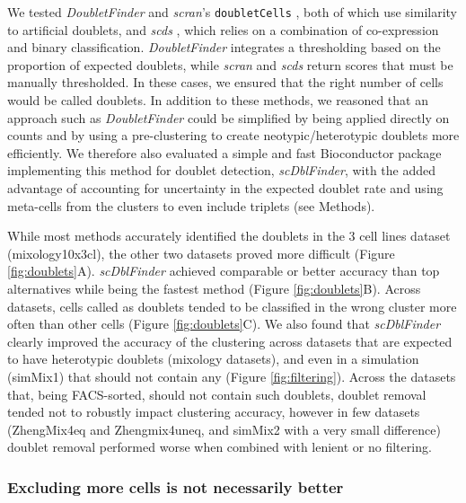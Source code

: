 \documentclass{bmcart}
\begin{document}
We tested \textit{DoubletFinder} \cite{mcginnisDoubletfinder2019} and \textit{scran}'s \texttt{doubletCells} \cite{LunScran2016}, both of which use similarity to artificial doublets, and \textit{scds} \cite{BaisScds2019}, which relies on a combination of co-expression and binary classification. \textit{DoubletFinder} integrates a thresholding based on the proportion of expected doublets, while \textit{scran} and \textit{scds} return scores that must be manually thresholded. In these cases, we ensured that the right number of cells would be called doublets. In addition to these methods, we reasoned that an approach such as \textit{DoubletFinder} could be simplified by being applied directly on counts and by using a pre-clustering to create neotypic/heterotypic doublets more efficiently. We therefore also evaluated a simple and fast Bioconductor package implementing this method for doublet detection, \textit{scDblFinder}, with the added advantage of accounting for uncertainty in the expected doublet rate and using meta-cells from the clusters to even include triplets (see Methods).

While most methods accurately identified the doublets in the 3 cell lines dataset (mixology10x3cl), the other two datasets proved more difficult (Figure \ref{fig:doublets}A). \textit{scDblFinder} achieved comparable or better accuracy than top alternatives while being the fastest method (Figure \ref{fig:doublets}B). Across datasets, cells called as doublets tended to be classified in the wrong cluster more often than other cells (Figure \ref{fig:doublets}C). We also found that {\color{red} \textit{scDblFinder} clearly improved the accuracy of the clustering across datasets that are expected to have heterotypic doublets (mixology datasets), and even in a simulation (simMix1) that should not contain any (Figure \ref{fig:filtering}). Across the datasets that, being FACS-sorted, should not contain such doublets, doublet removal tended not to robustly impact clustering accuracy, however in few datasets (ZhengMix4eq and Zhengmix4uneq, and simMix2 with a very small difference) doublet removal performed worse when combined with lenient or no filtering.}

\subsubsection*{Excluding more cells is not necessarily better}
\end{document}
